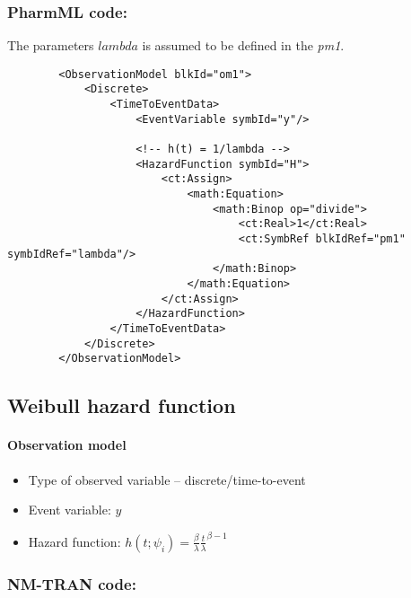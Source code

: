 \myEndLine

\subsubsection{PharmML code:}
The parameters $lambda$ is assumed to be defined in the  \emph{pm1}.

\lstset{language=XML}
\begin{lstlisting}
        <ObservationModel blkId="om1">
            <Discrete>
                <TimeToEventData>
                    <EventVariable symbId="y"/>
                    
                    <!-- h(t) = 1/lambda -->
                    <HazardFunction symbId="H">
                        <ct:Assign>
                            <math:Equation>
                                <math:Binop op="divide">
                                    <ct:Real>1</ct:Real>
                                    <ct:SymbRef blkIdRef="pm1" symbIdRef="lambda"/>
                                </math:Binop>
                            </math:Equation>
                        </ct:Assign>
                    </HazardFunction>
                </TimeToEventData>
            </Discrete>            
        </ObservationModel>
\end{lstlisting}


\subsection{Weibull hazard function}

\paragraph{Observation model}

\begin{itemize}
\item
Type of observed variable -- discrete/time-to-event
\item
Event variable: $y$
\item
Hazard function: $h(t; \psi_i) = \frac{\beta}{\lambda}\frac{t}{\lambda}^{\beta-1}$
\end{itemize}


\subsubsection{NM-TRAN code:}


